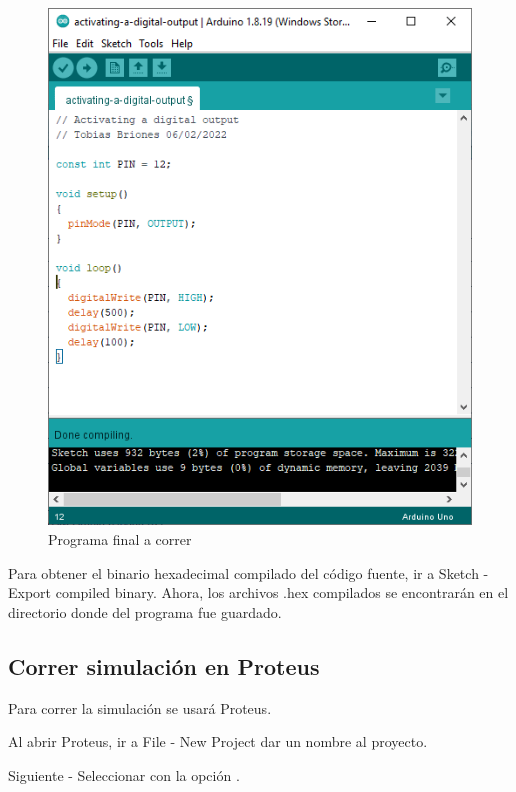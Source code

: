 \documentclass{article}
\begin{document}
    \begin{figure}[H]
        \centering
        \includegraphics[width=0.3\paperwidth]{images/arduino-2}
        \caption{Programa final a correr}\label{fig:figure3}
    \end{figure}

    Para obtener el binario hexadecimal compilado del código fuente, ir a
    Sketch - Export compiled binary.
    Ahora, los archivos .hex compilados se encontrarán en el directorio donde
    del programa fue guardado.

    \subsection{Correr simulación en Proteus}\label{subsec:correr-simulación
    -en-proteus}

    Para correr la simulación se usará Proteus.

    \bigbreak

    Al abrir Proteus, ir a File - New Project dar un nombre al proyecto.

    \bigbreak

    Siguiente - Seleccionar 
    con la opción .
\end{document}

